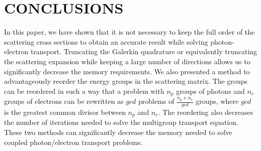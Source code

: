 \section{CONCLUSIONS}
In this paper, we have shown that it is not necessary to keep the full order of
the scattering cross sections to obtain an accurate result while solving
photon-electron transport. Truncating the Galerkin quadrature or equivalently
truncating the scattering expansion while keeping a large number of directions 
allows us to significantly decrease the memory requirements. We also presented a 
method to advantageously reorder the energy groups in the scattering matrix. 
The groups can be reordered in such a way that a problem with $n_p$ groups of 
photons and $n_e$ groups of electrons can be rewritten as $gcd$ problems of 
$\frac{n_p+n_e}{gcd}$ groups, where $gcd$ is the greatest common divisor 
between $n_p$ and $n_e$. The reordering also decreases the number of iterations 
needed to solve the multigroup transport equation. These two methods can 
significantly decrease the memory needed to solve coupled photon/electron 
transport problems.
